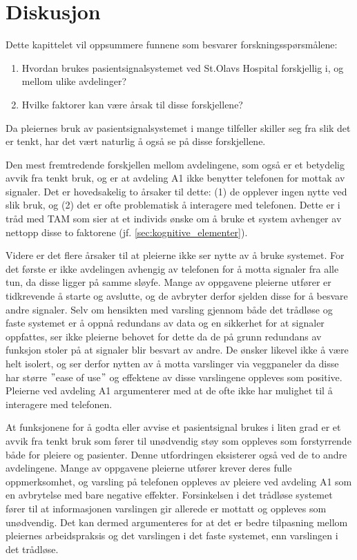 \chapter{Diskusjon}
\label{chp:diskusjon_rq}
Dette kapittelet vil oppsummere funnene som besvarer forskningsspørsmålene:

\begin{enumerate}
\item Hvordan brukes pasientsignalsystemet ved St.Olavs Hospital forskjellig i, og mellom ulike avdelinger? 
\item Hvilke faktorer kan være årsak til disse forskjellene?
\end{enumerate}

\noindent
Da pleiernes bruk av pasientsignalsystemet i mange tilfeller skiller seg fra slik det er tenkt, har det vært naturlig å også se på disse forskjellene.

\noindent
Den mest fremtredende forskjellen mellom avdelingene, som også er et betydelig avvik fra tenkt bruk, og er at avdeling A1 ikke benytter telefonen for mottak av signaler. Det er hovedsakelig to årsaker til dette: (1) de opplever ingen nytte ved slik bruk, og (2) det er ofte problematisk å interagere med telefonen. Dette er i tråd med TAM som sier at et individs ønske om å bruke et system avhenger av nettopp disse to faktorene (jf. \ref{sec:kognitive_elementer}). 

\noindent
Videre er det flere årsaker til at pleierne ikke ser nytte av å bruke systemet. For det første er ikke avdelingen avhengig av telefonen for å motta signaler fra alle tun, da disse ligger på samme sløyfe. Mange av oppgavene pleierne utfører er tidkrevende å starte og avslutte, og de avbryter derfor sjelden disse for å besvare andre signaler. Selv om hensikten med varsling gjennom både det trådløse og faste systemet er å oppnå redundans av data og en sikkerhet for at signaler oppfattes, ser ikke pleierne behovet for dette da de på grunn redundans av funksjon stoler på at signaler blir besvart av andre. De ønsker likevel ikke å være helt isolert, og ser derfor nytten av å motta varslinger via veggpaneler da disse har større $"$ease of use$"$ og effektene av disse varslingene oppleves som positive. Pleierne ved avdeling A1 argumenterer med at de ofte ikke har mulighet til å interagere med telefonen.

\noindent
At funksjonene for å godta eller avvise et pasientsignal brukes i liten grad er et avvik fra tenkt bruk som fører til unødvendig støy som oppleves som forstyrrende både for pleiere og pasienter. Denne utfordringen eksisterer også ved de to andre avdelingene. Mange av oppgavene pleierne utfører krever deres fulle oppmerksomhet, og varsling på telefonen oppleves av pleiere ved avdeling A1 som en avbrytelse med bare negative effekter. Forsinkelsen i det trådløse systemet fører til at informasjonen varslingen gir allerede er mottatt og oppleves som unødvendig. Det kan dermed argumenteres for at det er bedre tilpasning mellom pleiernes arbeidspraksis og det varslingen i det faste systemet, enn varslingen i det trådløse.

